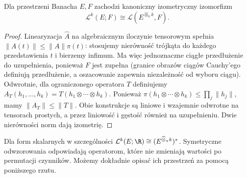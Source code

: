 \begin{stwierdzenie}
\label{ma2:prop:projective-linearization}
Dla przestrzeni Banacha $E,F$ zachodzi
kanoniczny izometryczny izomorfizm
\[
 \mathcal L^k(E;F)\cong
 \mathcal L(E^{\widehat\otimes_\pi k},F).
\]
\end{stwierdzenie}
\begin{proof}
Linearyzacja $\widehat A$ na algebraicznym
iloczynie tensorowym spełnia
$\|\widehat A(t)\|\le\|A\|\pi(t)$:
stosujemy nierówność trójkąta do każdego
przedstawienia $t$ i bierzemy infimum.
Ma więc jednoznaczne ciągłe przedłużenie
do uzupełnienia, ponieważ $F$ jest zupełna
(granice obrazów ciągów Cauchy'ego definiują
przedłużenie, a oszacowanie zapewnia
niezależność od wyboru ciągu).
Odwrotnie, dla ograniczonego operatora $T$
definiujemy
$A_T(h_1,\ldots,h_k)=T(h_1\otimes\cdots\otimes h_k)$.
Ponieważ $\pi(h_1\otimes\cdots\otimes h_k)
\le\prod_j\|h_j\|$, mamy $\|A_T\|\le\|T\|$.
Obie konstrukcje są liniowe i wzajemnie
odwrotne na tensorach prostych, a przez
liniowość i gęstość również na uzupełnieniu.
Dwie nierówności norm dają izometrię.
\end{proof}

Dla form skalarnych w szczególności
$\mathcal L^k(E;\R)\cong(E^{\widehat\otimes_\pi k})^*$.
Symetryczne odwzorowania odpowiadają operatorom,
które nie zmieniają wartości po permutacji
czynników. Możemy dokładnie opisać ich przestrzeń
za pomocą poniższego rzutu.

